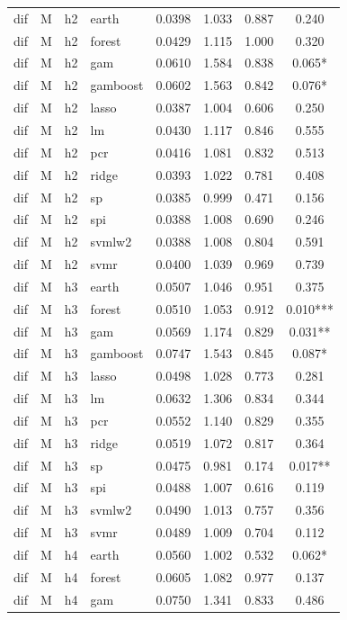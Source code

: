 \begin{ThreePartTable}
\begin{longtable}[t]{llclcccc}
\addlinespace
dif & M & h2 & earth & 0.0398 & 1.033 & 0.887 & 0.240\\
dif & M & h2 & forest & 0.0429 & 1.115 & 1.000 & 0.320\\
dif & M & h2 & gam & 0.0610 & 1.584 & 0.838 & 0.065*\\
dif & M & h2 & gamboost & 0.0602 & 1.563 & 0.842 & 0.076*\\
dif & M & h2 & lasso & 0.0387 & 1.004 & 0.606 & 0.250\\
dif & M & h2 & lm & 0.0430 & 1.117 & 0.846 & 0.555\\
dif & M & h2 & pcr & 0.0416 & 1.081 & 0.832 & 0.513\\
dif & M & h2 & ridge & 0.0393 & 1.022 & 0.781 & 0.408\\
dif & M & h2 & sp & 0.0385 & 0.999 & 0.471 & 0.156\\
dif & M & h2 & spi & 0.0388 & 1.008 & 0.690 & 0.246\\
dif & M & h2 & svmlw2 & 0.0388 & 1.008 & 0.804 & 0.591\\
dif & M & h2 & svmr & 0.0400 & 1.039 & 0.969 & 0.739\\
\addlinespace
dif & M & h3 & earth & 0.0507 & 1.046 & 0.951 & 0.375\\
dif & M & h3 & forest & 0.0510 & 1.053 & 0.912 & 0.010***\\
dif & M & h3 & gam & 0.0569 & 1.174 & 0.829 & 0.031**\\
dif & M & h3 & gamboost & 0.0747 & 1.543 & 0.845 & 0.087*\\
dif & M & h3 & lasso & 0.0498 & 1.028 & 0.773 & 0.281\\
dif & M & h3 & lm & 0.0632 & 1.306 & 0.834 & 0.344\\
dif & M & h3 & pcr & 0.0552 & 1.140 & 0.829 & 0.355\\
dif & M & h3 & ridge & 0.0519 & 1.072 & 0.817 & 0.364\\
dif & M & h3 & sp & 0.0475 & 0.981 & 0.174 & 0.017**\\
dif & M & h3 & spi & 0.0488 & 1.007 & 0.616 & 0.119\\
dif & M & h3 & svmlw2 & 0.0490 & 1.013 & 0.757 & 0.356\\
dif & M & h3 & svmr & 0.0489 & 1.009 & 0.704 & 0.112\\
\addlinespace
dif & M & h4 & earth & 0.0560 & 1.002 & 0.532 & 0.062*\\
dif & M & h4 & forest & 0.0605 & 1.082 & 0.977 & 0.137\\
dif & M & h4 & gam & 0.0750 & 1.341 & 0.833 & 0.486\\

\end{longtable}
\end{ThreePartTable}
